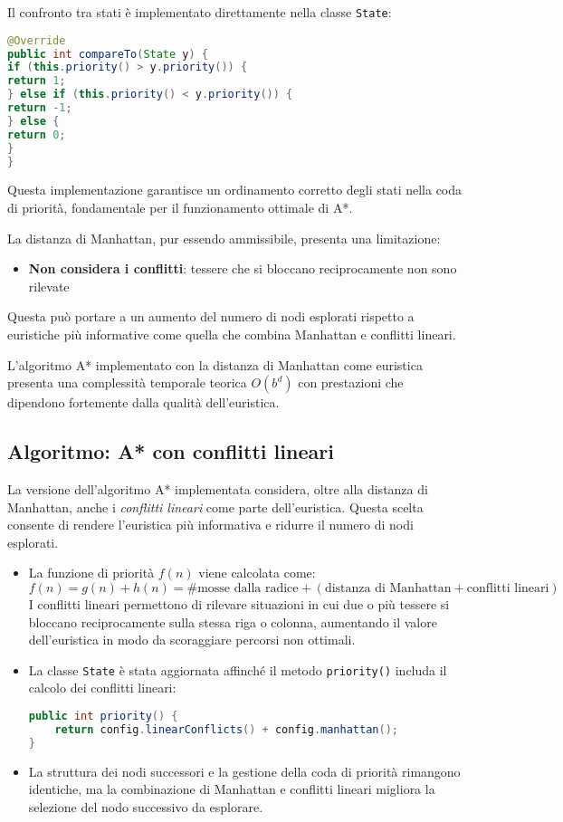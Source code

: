 Il confronto tra stati è implementato direttamente nella classe \texttt{State}:
\begin{lstlisting}[language=Java, caption=Implementazione del comparatore, float=h]
@Override
public int compareTo(State y) {
if (this.priority() > y.priority()) {
return 1;
} else if (this.priority() < y.priority()) {
return -1;
} else {
return 0;
}
}
\end{lstlisting}
Questa implementazione garantisce un ordinamento corretto degli stati nella coda di priorità, fondamentale per il funzionamento ottimale di A*.

La distanza di Manhattan, pur essendo ammissibile, presenta una limitazione:
\begin{itemize}
    \item \textbf{Non considera i conflitti}: tessere che si bloccano reciprocamente non sono rilevate
\end{itemize}

Questa può portare a un aumento del numero di nodi esplorati rispetto a euristiche più informative come quella che combina Manhattan e conflitti lineari.

L'algoritmo A* implementato con la distanza di Manhattan come euristica presenta una complessità temporale teorica $O(b^d)$ con prestazioni che dipendono fortemente dalla qualità dell'euristica.

\subsection{Algoritmo: A* con conflitti lineari}

La versione dell'algoritmo A* implementata considera, oltre alla distanza di Manhattan, anche i \emph{conflitti lineari} come parte dell'euristica. Questa scelta consente di rendere l'euristica più informativa e ridurre il numero di nodi esplorati.

\begin{itemize}
    \item La funzione di priorità $f(n)$ viene calcolata come:
    \[
        f(n) = g(n) + h(n) = \text{\#mosse dalla radice} + (\text{distanza di Manhattan} + \text{conflitti lineari})
    \]I conflitti lineari permettono di rilevare situazioni in cui due o più tessere si bloccano reciprocamente sulla stessa riga o colonna, aumentando il valore dell'euristica in modo da scoraggiare percorsi non ottimali.

    \item La classe \texttt{State} è stata aggiornata affinché il metodo \texttt{priority()} includa il calcolo dei conflitti lineari:
\begin{lstlisting}[language=Java]
public int priority() {
    return config.linearConflicts() + config.manhattan();
}
\end{lstlisting}
    \item La struttura dei nodi successori e la gestione della coda di priorità rimangono identiche, ma la combinazione di Manhattan e conflitti lineari migliora la selezione del nodo successivo da esplorare.
\end{itemize}

